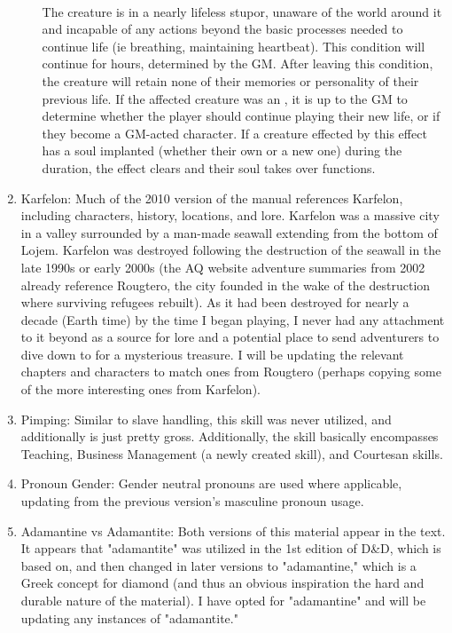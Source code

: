 \begin{enumerate}[leftmargin=12pt]
\begin{enumerate}
	\\
	The creature is in a nearly lifeless stupor, unaware of the world around it and incapable of any actions beyond the basic processes needed to continue life (ie breathing, maintaining heartbeat). This condition will continue for  hours, determined by the GM. After leaving this condition, the creature will retain none of their memories or personality of their previous life. If the affected creature was an , it is up to the GM to determine whether the player should continue playing their new life, or if they become a GM-acted character. If a creature effected by this effect has a soul implanted (whether their own or a new one) during the duration, the effect clears and their soul takes over functions.
\end{enumerate}
\item Karfelon: Much of the 2010 version of the manual references Karfelon, including characters, history, locations, and lore. Karfelon was a massive city in a valley surrounded by a man-made seawall extending from the bottom of Lojem. Karfelon was destroyed following the destruction of the seawall in the late 1990s or early 2000s (the AQ website adventure summaries from 2002 already reference Rougtero, the city founded in the wake of the destruction where surviving refugees rebuilt). As it had been destroyed for nearly a decade (Earth time) by the time I began playing, I never had any attachment to it beyond as a source for lore and a potential place to send adventurers to dive down to for a mysterious treasure. I will be updating the relevant chapters and characters to match ones from Rougtero (perhaps copying some of the more interesting ones from Karfelon).
\item Pimping: Similar to slave handling, this skill was never utilized, and additionally is just pretty gross. Additionally, the skill basically encompasses Teaching, Business Management (a newly created skill), and Courtesan skills. 
\item Pronoun Gender: Gender neutral pronouns are used where applicable, updating from the previous version's masculine pronoun usage.
\item Adamantine vs Adamantite: Both versions of this material appear in the text. It appears that "adamantite" was utilized in the 1st edition of D\&D, which \aq is based on, and then changed in later versions to "adamantine," which is a Greek concept for diamond (and thus an obvious inspiration the hard and durable nature of the material). I have opted for "adamantine" and will be updating any instances of "adamantite."

\end{enumerate}
